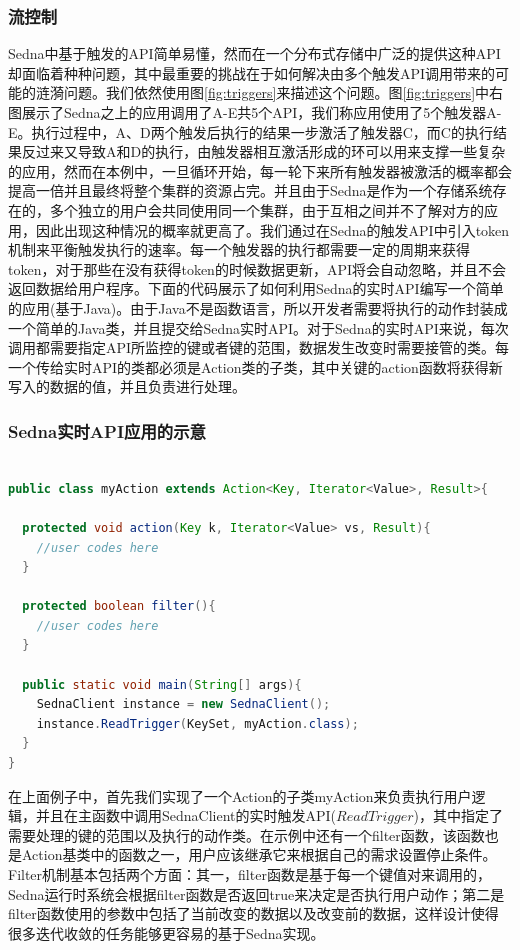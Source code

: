 \subsubsection{流控制}
Sedna中基于触发的API简单易懂，然而在一个分布式存储中广泛的提供这种API却面临着种种问题，其中最重要的挑战在于如何解决由多个触发API调用带来的可能的涟漪问题。我们依然使用图\ref{fig:triggers}来描述这个问题。图\ref{fig:triggers}中右图展示了Sedna之上的应用调用了A-E共5个API，我们称应用使用了5个触发器A-E。执行过程中，A、D两个触发后执行的结果一步激活了触发器C，而C的执行结果反过来又导致A和D的执行，由触发器相互激活形成的环可以用来支撑一些复杂的应用，然而在本例中，一旦循环开始，每一轮下来所有触发器被激活的概率都会提高一倍并且最终将整个集群的资源占完。并且由于Sedna是作为一个存储系统存在的，多个独立的用户会共同使用同一个集群，由于互相之间并不了解对方的应用，因此出现这种情况的概率就更高了。我们通过在Sedna的触发API中引入token机制来平衡触发执行的速率。每一个触发器的执行都需要一定的周期来获得token，对于那些在没有获得token的时候数据更新，API将会自动忽略，并且不会返回数据给用户程序。下面的代码展示了如何利用Sedna的实时API编写一个简单的应用(基于Java)。由于Java不是函数语言，所以开发者需要将执行的动作封装成一个简单的Java类，并且提交给Sedna实时API。对于Sedna的实时API来说，每次调用都需要指定API所监控的键或者键的范围，数据发生改变时需要接管的类。每一个传给实时API的类都必须是Action类的子类，其中关键的action函数将获得新写入的数据的值，并且负责进行处理。

\subsubsection{Sedna实时API应用的示意}
\begin{lstlisting}[language=java]

public class myAction extends Action<Key, Iterator<Value>, Result>{

  protected void action(Key k, Iterator<Value> vs, Result){
    //user codes here
  }

  protected boolean filter(){
    //user codes here
  }

  public static void main(String[] args){
    SednaClient instance = new SednaClient();
    instance.ReadTrigger(KeySet, myAction.class);
  }
}
\end{lstlisting}

在上面例子中，首先我们实现了一个Action的子类myAction来负责执行用户逻辑，并且在主函数中调用SednaClient的实时触发API($ReadTrigger$)，其中指定了需要处理的键的范围以及执行的动作类。在示例中还有一个filter函数，该函数也是Action基类中的函数之一，用户应该继承它来根据自己的需求设置停止条件。Filter机制基本包括两个方面：其一，filter函数是基于每一个键值对来调用的，Sedna运行时系统会根据filter函数是否返回true来决定是否执行用户动作；第二是filter函数使用的参数中包括了当前改变的数据以及改变前的数据，这样设计使得很多迭代收敛的任务能够更容易的基于Sedna实现。

